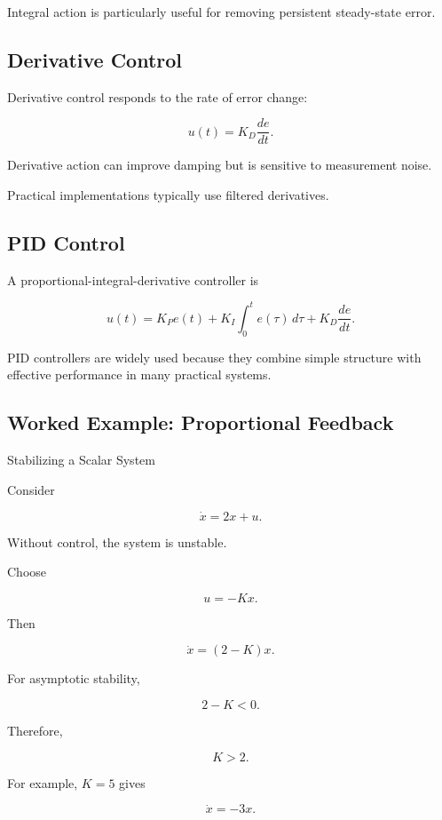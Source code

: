 Integral action is particularly useful for removing persistent steady-state
error.

\subsection{Derivative Control}
\label{subsec:derivative-control}

Derivative control responds to the rate of error change:

\[
\boxed{
u(t)
=
K_D
\frac{de}{dt}.
}
\]

Derivative action can improve damping but is sensitive to measurement noise.

Practical implementations typically use filtered derivatives.

\subsection{PID Control}
\label{subsec:pid-control}

A proportional-integral-derivative controller is

\[
\boxed{
u(t)
=
K_Pe(t)
+
K_I
\int_0^t
e(\tau)\,d\tau
+
K_D
\frac{de}{dt}.
}
\]

PID controllers are widely used because they combine simple structure with
effective performance in many practical systems.

\subsection{Worked Example: Proportional Feedback}
\label{subsec:worked-proportional-feedback}

\begin{workedexamplebox}{Stabilizing a Scalar System}

Consider

\[
\dot{x}
=
2x+u.
\]

Without control, the system is unstable.

Choose

\[
u=-Kx.
\]

Then

\[
\dot{x}
=
(2-K)x.
\]

For asymptotic stability,

\[
2-K<0.
\]

Therefore,

\begin{answerbox}
\[
\boxed{
K>2.
}
\]
\end{answerbox}

For example, \(K=5\) gives

\[
\dot{x}=-3x.
\]

\end{workedexamplebox}

